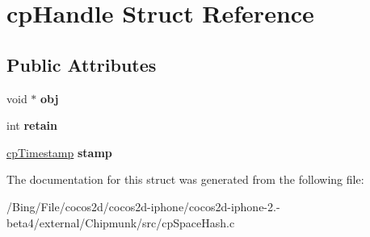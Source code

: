 \hypertarget{structcp_handle}{\section{cp\-Handle Struct Reference}
\label{structcp_handle}
}
\subsection*{Public Attributes}
\begin{DoxyCompactItemize}
\item 
\hypertarget{structcp_handle_ae651cb0a7350baf2e5b05a0a5cb184eb}{void $\ast$ {\bfseries obj}}\label{structcp_handle_ae651cb0a7350baf2e5b05a0a5cb184eb}

\item 
\hypertarget{structcp_handle_ab10b85d669df406553b5e5ab481ecbaf}{int {\bfseries retain}}\label{structcp_handle_ab10b85d669df406553b5e5ab481ecbaf}

\item 
\hypertarget{structcp_handle_ac36d4b7523d86707a4bf1eccb3e74860}{\hyperlink{group__basic_types_gaa24652c104082d0725066ea5ac7dc83f}{cp\-Timestamp} {\bfseries stamp}}\label{structcp_handle_ac36d4b7523d86707a4bf1eccb3e74860}

\end{DoxyCompactItemize}


The documentation for this struct was generated from the following file\-:\begin{DoxyCompactItemize}
\item 
/\-Bing/\-File/cocos2d/cocos2d-\/iphone/cocos2d-\/iphone-\/2.-\/beta4/external/\-Chipmunk/src/cp\-Space\-Hash.\-c\end{DoxyCompactItemize}
